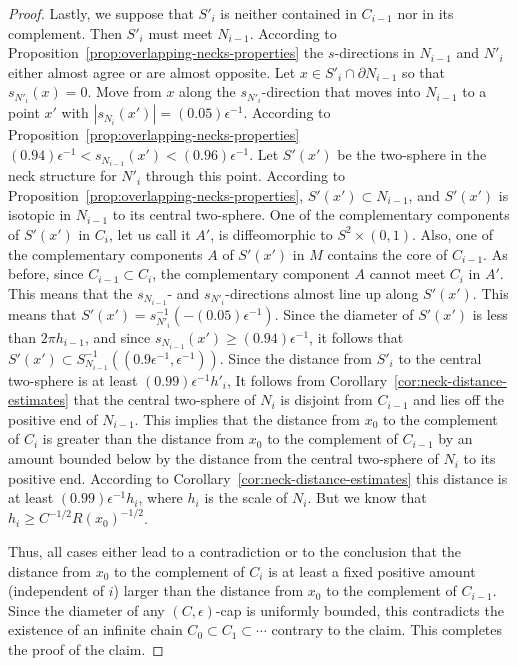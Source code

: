 \begin{proof}
Lastly, we suppose that $S'_i$ is neither contained in $C_{i-1}$ nor
in its complement. Then $S'_i$ must meet $N_{i-1}$.  According to
Proposition~\ref{prop:overlapping-necks-properties} the $s$-directions in $N_{i-1}$ and
$N'_i$ either almost agree or are almost opposite. Let $x\in
S'_i\cap \partial N_{i-1}$ so that $s_{N'_i}(x)=0$. Move from $x$
along the $s_{N'_i}$-direction that moves into $N_{i-1}$ to a point
$x'$ with $|s_{N_i}(x')|=(0.05)\epsilon^{-1}$. According to
Proposition~\ref{prop:overlapping-necks-properties}
$(0.94)\epsilon^{-1}<s_{N_{i-1}}(x')<(0.96)\epsilon^{-1}$.
 Let $S'(x')$ be the two-sphere in the neck structure for $N'_i$
 through this point. According to Proposition~\ref{prop:overlapping-necks-properties},
 $S'(x')\subset N_{i-1}$, and $S'(x')$ is isotopic in $N_{i-1}$ to its
 central two-sphere. One of the complementary components of $S'(x')$
 in $C_i$, let us call it $A'$, is diffeomorphic to $S^2\times (0,1)$. Also, one of the
 complementary components $A$ of $S'(x')$ in $M$ contains the core of
 $C_{i-1}$. As before, since $C_{i-1}\subset C_i$, the complementary
 component $A$ cannot meet $C_i$ in $A'$. This means that
 the $s_{N_{i-1}}$- and $s_{N'_i}$-directions almost line up along
 $S'(x')$. This means that
 $S'(x')=s_{N'_i}^{-1}(-(0.05)\epsilon^{-1})$. Since the diameter of
 $S'(x')$ is less than $2\pi h_{i-1}$, and since
  $s_{N_{i-1}}(x')\ge (0.94)\epsilon^{-1}$, it follows
 that $S'(x')\subset
 S_{N_{i-1}}^{-1}((0.9\epsilon^{-1},\epsilon^{-1}))$.
Since the distance from $S'_i$ to the central two-sphere is at least
$(0.99)\epsilon^{-1}h'_i$,  It follows from Corollary~\ref{cor:neck-distance-estimates}
that the central two-sphere of $N_i$ is disjoint from $C_{i-1}$ and
lies off the positive end of $N_{i-1}$. This implies that the
distance from $x_0$ to the complement of $C_i$ is greater than the
distance from $x_0$ to the complement of $C_{i-1}$ by an amount
bounded below by the distance from the central two-sphere of $N_i$
to its positive end. According to Corollary~\ref{cor:neck-distance-estimates} this
distance is at least $(0.99)\epsilon^{-1}h_i$, where $h_i$ is the
scale of $N_i$. But we know that  $h_i\ge C^{-1/2}R(x_0)^{-1/2}$.

Thus, all cases either lead to a contradiction or to the conclusion
that the distance from $x_0$ to the complement of $C_i$ is at least
a fixed positive amount (independent of $i$) larger than the
distance from $x_0$ to the complement of $C_{i-1}$.
 Since the diameter of any $(C,\epsilon)$-cap is
uniformly bounded, this contradicts the existence of an infinite
chain $C_0\subset C_1\subset \cdots$ contrary to the claim. This
completes the proof of the claim.
\end{proof}

